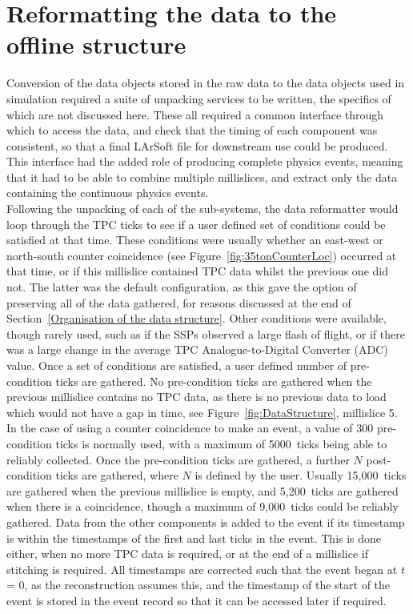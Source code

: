 \section{Reformatting the data to the offline structure} \label{Reformatting the data to the offline structure} %
Conversion of the data objects stored in the raw data to the data objects used in simulation required a suite of unpacking services to be written, the specifics of which are not discussed here. These all required a common interface through which to access the data, and check that the timing of each component was consistent, so that a final LArSoft file for downstream use could be produced. This interface had the added role of producing complete physics events, meaning that it had to be able to combine multiple millislices, and extract only the data containing the continuous physics events. \\

Following the unpacking of each of the sub-systems, the data reformatter would loop through the TPC ticks to see if a user defined set of conditions could be satisfied at that time. These conditions were usually whether an east-west or north-south counter coincidence (see Figure~\ref{fig:35tonCounterLoc}) occurred at that time, or if this millislice contained TPC data whilst the previous one did not. The latter was the default configuration, as this gave the option of preserving all of the data gathered, for reasons discussed at the end of Section~\ref{Organisation of the data structure}. Other conditions were available, though rarely used, such as if the SSPs observed a large flash of flight, or if there was a large change in the average TPC Analogue-to-Digital Converter (ADC) value. Once a set of conditions are satisfied, a user defined number of pre-condition ticks are gathered. No pre-condition ticks are gathered when the previous millislice contains no TPC data, as there is no previous data to load which would not have a gap in time, see Figure~\ref{fig:DataStructure}, millislice 5. In the case of using a counter coincidence to make an event, a value of 300 pre-condition ticks is normally used, with a maximum of 5000~ticks being able to reliably collected. Once the pre-condition ticks are gathered, a further $N$ post-condition ticks are gathered, where $N$ is defined by the user. Usually 15,000~ticks are gathered when the previous millislice is empty, and 5,200~ticks are gathered when there is a coincidence, though a maximum of 9,000~ticks could be reliably gathered. Data from the other components is added to the event if its timestamp is within the timestamps of the first and last ticks in the event. This is done either, when no more TPC data is required, or at the end of a millislice if stitching is required. All timestamps are corrected such that the event began at $t$ = 0, as the reconstruction assumes this, and the timestamp of the start of the event is stored in the event record so that it can be accessed later if required. \\

